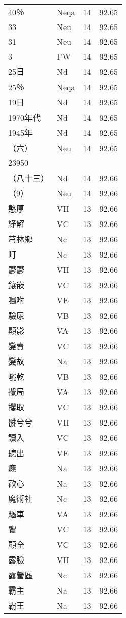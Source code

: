 \documentclass[twocolumn]{book}
\begin{document}
\begin{supertabular}{llrr}
40％ & Neqa & 14 &  92.65\\
33 & Neu & 14 &  92.65\\
31 & Neu & 14 &  92.65\\
3 & FW & 14 &  92.65\\
25日 & Nd & 14 &  92.65\\
25％ & Neqa & 14 &  92.65\\
19日 & Nd & 14 &  92.65\\
1970年代 & Nd & 14 &  92.65\\
1945年 & Nd & 14 &  92.65\\
（六） & Neu & 14 &  92.65\\
23950\\
（八十三） & Nd & 14 &  92.66\\
（9） & Neu & 14 &  92.66\\
憨厚 & VH & 13 &  92.66\\
紓解 & VC & 13 &  92.66\\
芎林鄉 & Nc & 13 &  92.66\\
町 & Nc & 13 &  92.66\\
鬱鬱 & VH & 13 &  92.66\\
鑲嵌 & VC & 13 &  92.66\\
囑咐 & VE & 13 &  92.66\\
驗尿 & VB & 13 &  92.66\\
顯影 & VA & 13 &  92.66\\
變賣 & VC & 13 &  92.66\\
變故 & Na & 13 &  92.66\\
曬乾 & VB & 13 &  92.66\\
攪局 & VA & 13 &  92.66\\
攫取 & VC & 13 &  92.66\\
髒兮兮 & VH & 13 &  92.66\\
讀入 & VC & 13 &  92.66\\
聽出 & VE & 13 &  92.66\\
癮 & Na & 13 &  92.66\\
歡心 & Na & 13 &  92.66\\
魔術社 & Nc & 13 &  92.66\\
驅車 & VA & 13 &  92.66\\
饗 & VC & 13 &  92.66\\
顧全 & VC & 13 &  92.66\\
露臉 & VH & 13 &  92.66\\
露營區 & Nc & 13 &  92.66\\
霸主 & Na & 13 &  92.66\\
霸王 & Na & 13 &  92.66\\

\end{supertabular}
\end{document}
